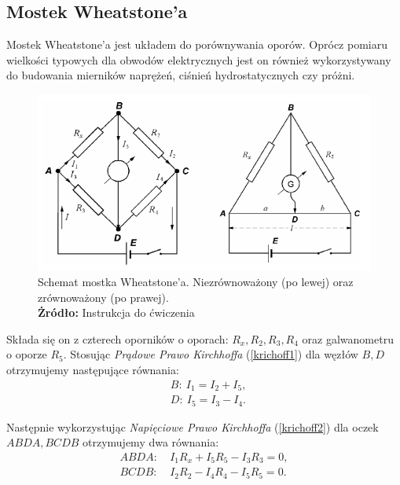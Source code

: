 \documentclass[12pt,a4paper]{article}
\numberwithin{equation}{section}
\newcommand*{\captionsource}[2]{%
	\caption[{#1}]{%
		#1%
		\\\hspace{\linewidth}%
		\textbf{Żródło:} #2%
	}%
}
\begin{document}
\subsection{Mostek Wheatstone'a}

Mostek Wheatstone'a jest układem do porównywania oporów. Oprócz pomiaru wielkości typowych dla obwodów elektrycznych jest on również wykorzystywany do budowania mierników naprężeń, ciśnień hydrostatycznych czy próżni. 

\begin{figure}[!htb]
	\includegraphics[width=1\textwidth]{img/mostek.png} 
	\captionsource{Schemat mostka Wheatstone'a. Niezrównoważony (po lewej) oraz zrównoważony (po prawej).}{Instrukcja do ćwiczenia}
	\label{fig:img1}
\end{figure}


Składa się on z czterech oporników o oporach: $R_x, R_2, R_3, R_4$ oraz galwanometru o oporze $R_5$. Stosując \emph{Prądowe Prawo Kirchhoffa} (\ref{krichoff1}) dla węzłów $B, D$ otrzymujemy następujące równania:
\begin{equation}
	\begin{split}
	&B:~I_1 = I_2 + I_5, \\
	&D:~I_5 = I_3 - I_4.
	\end{split}
	\label{eq:e1}
\end{equation}

\pagebreak
Następnie wykorzystując \emph{Napięciowe Prawo Kirchhoffa} (\ref{krichoff2}) dla oczek $ABDA, BCDB$ otrzymujemy dwa równania:
\begin{equation}
	\begin{split}
	ABDA:&~I_1 R_x + I_5 R_5 - I_3 R_3 = 0, \\
	BCDB:&~I_2 R_2 - I_4 R_4 - I_5 R_5 = 0.
	\end{split}
	\label{eq:e2}
\end{equation}
\end{document}
